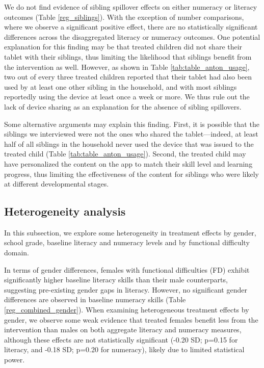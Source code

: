 \documentclass[hidelinks,12pt]{article}
\begin{document}
\begin{singlespace}
We do not find evidence of sibling spillover effects on either numeracy or literacy outcomes (Table \ref{reg_siblings}). With the exception of number comparisons, where we observe a significant positive effect, there are no statistically significant differences across the disaggregated literacy or numeracy outcomes. One potential explanation for this finding may be that treated children did not share their tablet with their siblings, thus limiting the likelihood that siblings benefit from the intervention as well. However, as shown in Table \ref{tab:table_anton_usage}, two out of every three treated children reported that their tablet had also been used by at least one other sibling in the household, and with most siblings reportedly using the device at least once a week or more. We thus rule out the lack of device sharing as an explanation for the absence of sibling spillovers.

Some alternative arguments may explain this finding. First, it is possible that the siblings we interviewed were not the ones who shared the tablet—indeed, at least half of all siblings in the household never used the device that was issued to the treated child (Table \ref{tab:table_anton_usage}). Second, the treated child may have personalized the content on the app to match their skill level and learning progress, thus limiting the effectiveness of the content for siblings who were likely at different developmental stages.

\subsection{Heterogeneity analysis}
In this subsection, we explore some heterogeneity in treatment effects by gender, school grade, baseline literacy and numeracy levels and by functional difficulty domain.

In terms of gender differences, females with functional difficulties (FD) exhibit significantly higher baseline literacy skills than their male counterparts, suggesting pre-existing gender gaps in literacy. However, no significant gender differences are observed in baseline numeracy skills (Table \ref{reg_combined_gender}). When examining heterogeneous treatment effects by gender, we observe some weak evidence that treated females benefit less from the intervention than males on both aggregate literacy and numeracy measures, although these effects are not statistically significant (-0.20 SD; p=0.15 for literacy, and -0.18 SD; p=0.20 for numeracy), likely due to limited statistical power.


\end{singlespace}
\end{document}

